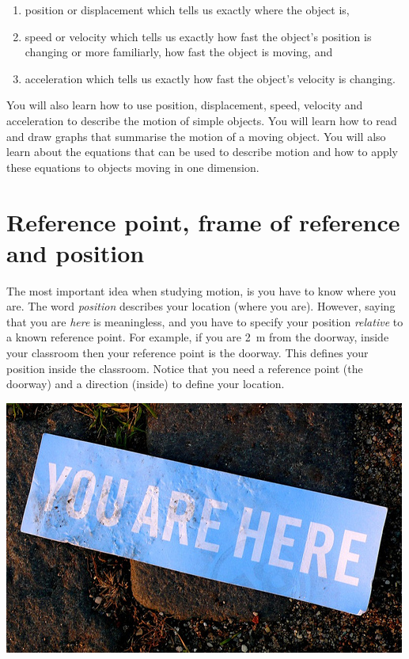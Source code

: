       \label{m38787*id62541}\begin{enumerate}[noitemsep, label=\textbf{\arabic*}. ] 
            \label{m38787*uid1}\item position or displacement which tells us exactly where the object is,
\label{m38787*uid2}\item speed or velocity which tells us exactly how fast the object's position is changing or more familiarly, how fast the object is moving, and
\label{m38787*uid3}\item acceleration which tells us exactly how fast the object's velocity is changing.
\end{enumerate}
      \label{m38787*id62581}You will also learn how to use position, displacement, speed, velocity and acceleration to describe the motion of simple objects. You will learn how to read and draw graphs that summarise the motion of a moving object. You will also learn about the equations that can be used to describe motion and how to apply these equations to objects moving in one dimension.\par 
    \label{m38787*cid3}
            \section{Reference point, frame of reference and position}
            \nopagebreak
\begin{minipage}{.6\textwidth}
      \label{m38787*id62597}The most important idea when studying motion, is you have to know where you are. The word \textsl{position} describes your location (where you are). However, saying that you are \textsl{here} is meaningless, and you have to specify your position \textsl{relative} to a known reference point. For example, if you are 2~m from the doorway, inside your classroom then your reference point is the doorway. This defines your position inside the classroom. Notice that you need a reference point (the doorway) and a direction (inside) to define your location.\par 
\end{minipage}
\begin{minipage}{.7\textwidth}
 \includegraphics[width=.5\textwidth]{photos/youarehereby_chokola_flickr.jpg}
\end{minipage}

